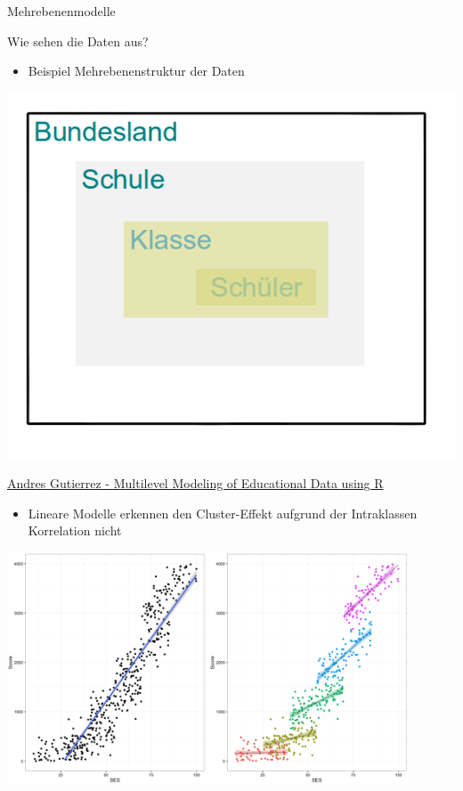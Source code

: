 \documentclass[ignorenonframetext,]{beamer}
\providecommand{\tightlist}{%
\setlength{\itemsep}{0pt}\setlength{\parskip}{0pt}}
\begin{document}
\begin{frame}[fragile]{Mehrebenenmodelle}

\begin{block}{Wie sehen die Daten aus?}

\begin{itemize}
\tightlist
\item
  Beispiel Mehrebenenstruktur der Daten
\end{itemize}

\includegraphics{./tex2pdf.9796/4786156521501da76e0a51cf5994ecce9933ddb2.png}

\end{block}

\begin{block}{\href{https://www.r-bloggers.com/multilevel-modeling-of-educational-data-using-r-part-1/}{Andres
Gutierrez - Multilevel Modeling of Educational Data using R}}

\begin{itemize}
\tightlist
\item
  Lineare Modelle erkennen den Cluster-Effekt aufgrund der Intraklassen
  Korrelation nicht
\end{itemize}

\includegraphics{./tex2pdf.9796/5efcbb58de37ba05260cc6662c0f6bca20a5ce63.png}


\end{block}
\end{frame}
\end{document}
